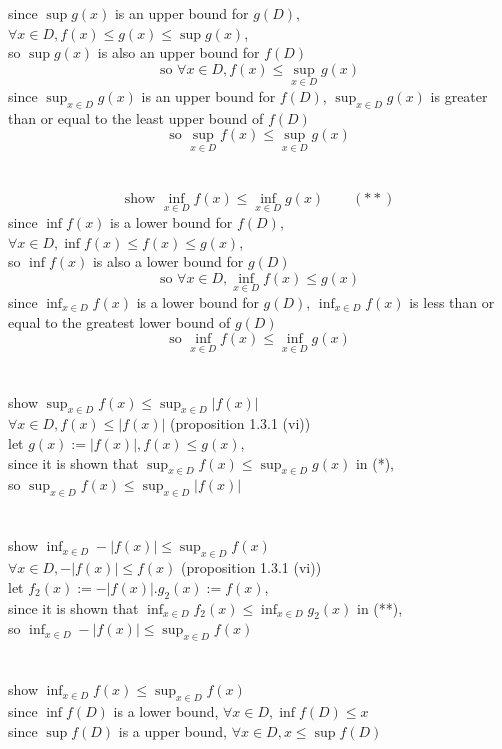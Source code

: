 \documentclass[12pt, border = 4pt, multi]{article} %
\begin{document}
since $\sup g(x)$ is an upper bound for $g(D)$, $\forall x \in D, f(x) \leq g(x) \leq \sup g(x)$,\\
so $\sup g(x)$ is also an upper bound for $f(D)$
\[\text{so }\forall x \in D, f(x) \leq \sup_{x \in D} g(x)\]
since $\sup_{x \in D} g(x)$ is an upper bound for $f(D)$, $\sup_{x \in D} g(x)$ is greater than or equal to the least upper bound of $f(D)$
\[\text{so }\sup_{x \in D} f(x) \leq \sup_{x \in D} g(x)\]
\\
\\
\[\text{show }\inf_{x \in D} f(x) \leq \inf_{x \in D} g(x) \qquad (**)\]
since $\inf f(x)$ is a lower bound for $f(D)$, $\forall x \in D, \inf f(x) \leq f(x) \leq g(x)$,\\
so $\inf f(x)$ is also a lower bound for $g(D)$
\[\text{so }\forall x \in D, \inf_{x \in D} f(x) \leq g(x)\]
since $\inf_{x \in D} f(x)$ is a lower bound for $g(D)$, $\inf_{x \in D} f(x)$ is less than or equal to the greatest lower bound of $g(D)$
\[\text{so }\inf_{x \in D} f(x) \leq \inf_{x \in D} g(x)\]
\\
\\
show $\sup_{x \in D} f(x) \leq \sup_{x \in D} |f(x)|$\\
$\forall x \in D, f(x) \leq |f(x)|$ \qquad (proposition 1.3.1 (vi))\\
let $g(x) := |f(x)|, f(x) \leq g(x)$,\\
since it is shown that $\sup_{x \in D} f(x) \leq \sup_{x \in D} g(x)$ in (*),\\
so $\sup_{x \in D} f(x) \leq \sup_{x \in D} |f(x)|$\\
\\
\\
show $\inf_{x \in D} -|f(x)| \leq \sup_{x \in D} f(x)$\\
$\forall x \in D, -|f(x)| \leq f(x)$ \qquad (proposition 1.3.1 (vi))\\
let $f_2(x) := -|f(x)|. g_2(x) := f(x)$,\\
since it is shown that $\inf_{x \in D} f_2(x) \leq \inf_{x \in D} g_2(x)$ in (**),\\
so $\inf_{x \in D} -|f(x)| \leq \sup_{x \in D} f(x)$\\
\\
\\
show $\inf_{x \in D} f(x) \leq \sup_{x \in D} f(x)$\\
since $\inf f(D)$ is a lower bound, $\forall x \in D, \inf f(D) \leq x$\\
since $\sup f(D)$ is a upper bound, $\forall x \in D, x \leq \sup f(D)$\\
\end{document}
